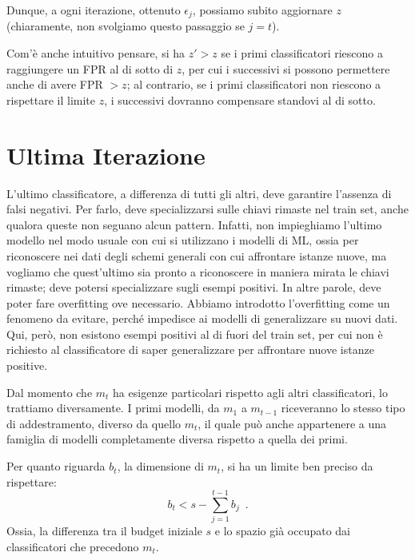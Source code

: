 Dunque, a ogni iterazione, ottenuto $\epsilon_j$, possiamo subito aggiornare $z$ (chiaramente, non svolgiamo questo passaggio se $j=t$).

Com'è anche intuitivo pensare, si ha $z' > z$ se i primi classificatori riescono a raggiungere un FPR al di sotto di $z$, per cui i successivi si possono permettere anche di avere FPR $> z$; al contrario, se i primi classificatori non riescono a rispettare il limite $z$, i successivi dovranno compensare standovi al di sotto.








\section{Ultima Iterazione}
\label{par:ultima-iterazione}
L'ultimo classificatore, a differenza di tutti gli altri, deve garantire l'assenza di falsi negativi. Per farlo, deve specializzarsi sulle chiavi rimaste nel train set, anche qualora queste non seguano alcun pattern. Infatti, non impieghiamo l'ultimo modello nel modo usuale con cui si utilizzano i modelli di ML, ossia per riconoscere nei dati degli schemi generali con cui affrontare istanze nuove, ma vogliamo che quest'ultimo sia pronto a riconoscere in maniera mirata le chiavi rimaste; deve potersi specializzare sugli esempi positivi. In altre parole, deve poter fare overfitting ove necessario. 
Abbiamo introdotto l'overfitting come un fenomeno da evitare, perché impedisce ai modelli di generalizzare su nuovi dati. Qui, però, non esistono esempi positivi al di fuori del train set, per cui non è richiesto al classificatore di saper generalizzare per affrontare nuove istanze positive.

Dal momento che $m_t$ ha esigenze particolari rispetto agli altri classificatori, lo trattiamo diversamente. I primi modelli, da $m_1$ a $m_{t-1}$ riceveranno lo stesso tipo di addestramento, diverso da quello $m_t$, il quale può anche appartenere a una famiglia di modelli completamente diversa rispetto a quella dei primi.

Per quanto riguarda $b_t$, la dimensione di $m_t$, si ha un limite ben preciso da rispettare:
\begin{equation}
    b_t < s - \sum_{j=1}^{t-1} b_j \enspace.
\end{equation}
Ossia, la differenza tra il budget iniziale $s$ e lo spazio già occupato dai classificatori che precedono $m_t$.

